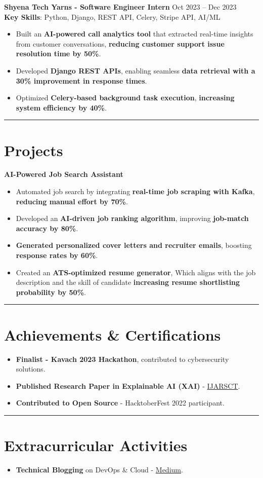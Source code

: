 \documentclass[a4paper,10pt]{article}
\begin{document}
\vspace{3 pt}
\textbf{Shyena Tech Yarns - Software Engineer Intern} \hfill Oct 2023 -- Dec 2023\\
\textbf{Key Skills}: Python, Django, REST API, Celery, Stripe API, AI/ML  
\begin{itemize}
    \item Built an \textbf{AI-powered call analytics tool} that extracted real-time insights from customer conversations, \textbf{reducing customer support issue resolution time by 50\%}.  
    \item Developed \textbf{Django REST APIs}, enabling seamless \textbf{data retrieval with a 30\% improvement in response times}.  
    \item Optimized \textbf{Celery-based background task execution}, \textbf{increasing system efficiency by 40\%}.  
\end{itemize}
\vspace{3 pt}


\hrule
\section*{Projects}
\textbf{AI-Powered Job Search Assistant}  
\begin{itemize}
    \item Automated job search by integrating \textbf{real-time job scraping with Kafka}, \textbf{reducing manual effort by 70\%}.  
    \item Developed an \textbf{AI-driven job ranking algorithm}, improving \textbf{job-match accuracy by 80\%}.  
    \item \textbf{Generated personalized cover letters and recruiter emails}, boosting \textbf{response rates by 60\%}.  
    \item Created an \textbf{ATS-optimized resume generator}, Which aligns with the job description and the skill of candidate \textbf{increasing resume shortlisting probability by 50\%}.  
\end{itemize}

\vspace{3 pt}

\hrule
\vspace{3pt}

\section*{Achievements \& Certifications}
\begin{itemize}
    \item \textbf{Finalist - Kavach 2023 Hackathon}, contributed to cybersecurity solutions.
    \item \textbf{Published Research Paper in Explainable AI (XAI)} - \href{https://ijarsct.co.in/Paper18344.pdf}{IJARSCT}.
    \item \textbf{Contributed to Open Source} - HacktoberFest 2022 participant.
\end{itemize}

\hrule
\vspace{3pt}

\section*{Extracurricular Activities}
\begin{itemize}
    \item \textbf{Technical Blogging} on DevOps \& Cloud - \href{https://medium.com/@yash.7232.rajput}{Medium}.
\end{itemize}
\end{document}
